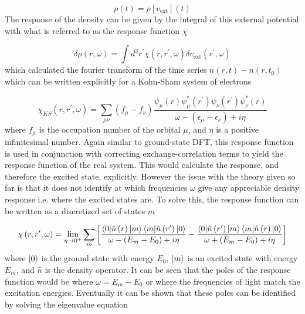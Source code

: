 \begin{equation}
\rho\left(t\right) = \rho\left[v_{\text{ext}}\right]\left(t\right)
\end{equation}
%
The response of the density can be given by the integral of this external potential
with what is referred to as the response function $\chi$

\begin{equation}
    \delta \rho \left(r, \omega \right) = \int d^3 r^\prime \chi \left(r, r^\prime, \omega \right) \delta v_{\text{ext}} \left(r^\prime, \omega \right)
\end{equation}
%
which calculated the fourier transform of the time series $n\left(r, t\right) - n\left(r, t_0\right)$
which can be written explicitly for a Kohn-Sham system of electrons

\begin{equation}
    \chi_{KS} \left(r, r^\prime, \omega \right) = \sum_{\mu\nu} \left(f_\mu - f_\nu \right) \frac{\psi_\mu\left(r\right)\psi^\ast_\mu\left(r^\prime\right) \psi_\nu\left(r^\prime\right) \psi^\ast_\nu\left(r\right)}{\omega - \left(\epsilon_\mu - \epsilon_\nu\right) + i\eta}
\end{equation}
%
where $f_\mu$ is the occupation number of the orbital $\mu$, and $\eta$ is a positive
infinitesimal number. Again similar to ground-state DFT, this response function 
is used in conjunction with correcting exchange-correlation terms to yield the response
function of the real system. This would calculate the response, and therefore the 
excited state, explicitly. However the issue with the theory given so far is that
it does not identify at which frequencies $\omega$ give any appreciable density 
response i.e. where the excited states are. To solve this, the response function 
can be written as a discretized set of states $m$

\begin{equation}
    \chi\left(r, r^\prime, \omega \right) = \lim_{\eta \to 0^+} \sum_m \left[ \frac{\braket{0|\hat{n}\left(r\right)|m}\braket{m|\hat{n}\left(r^\prime\right)|0}}{\omega - \left(E_m - E_0\right) + i\eta} - \frac{\braket{0|\hat{n}\left(r^\prime\right)|m}\braket{m|\hat{n}\left(r\right)|0}}{\omega + \left(E_m - E_0\right) + i\eta} \right]
\end{equation}
%
where $\ket{0}$ is the ground state with energy $E_0$, $\ket{m}$ is an excited state
with energy $E_m$, and $\hat{n}$ is the density operator. It can be seen that the
poles of the response function would be where $\omega = E_m - E_0$ or where the 
frequencies of light match the excitation energies. Eventually it can be shown that
these poles can be identified by solving the eigenvalue equation

